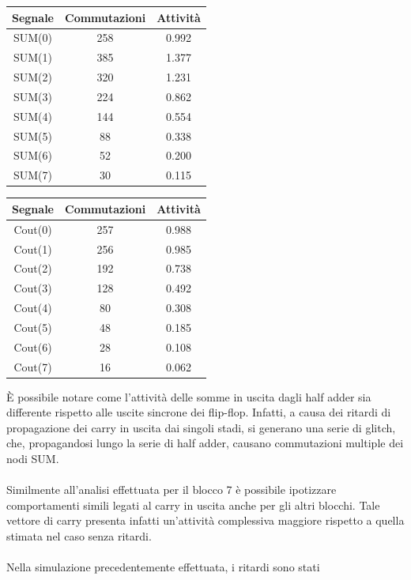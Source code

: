 \documentclass[11pt,  english, makeidx, a4paper, titlepage, oneside]{book}
\begin{document}
\begin{center}
	\begin{tabular}{|c|c|c|}
	\hline
	Segnale & Commutazioni & Attività \\ 
	\hline
	SUM(0) & 258  & 0.992  \\
	\hline
	SUM(1) & 385  & 1.377  \\
	\hline
	SUM(2) & 320  &  1.231  \\
	\hline
	SUM(3) & 224  & 0.862  \\
	\hline
	SUM(4) & 144  & 0.554  \\
	\hline
	SUM(5) & 88  & 0.338  \\
	\hline
	SUM(6) & 52  & 0.200  \\
	\hline
	SUM(7) & 30  & 0.115  \\
	\hline
	\end{tabular}	
	\begin{tabular}{|c|c|c|}
	\hline
	Segnale & Commutazioni & Attività \\ 
	\hline
	Cout(0) & 257  & 0.988  \\
	\hline
	Cout(1) & 256  & 0.985  \\
	\hline
	Cout(2) & 192  & 0.738  \\
	\hline
	Cout(3) & 128  & 0.492  \\
	\hline
	Cout(4) & 80  & 0.308  \\
	\hline
	Cout(5) & 48  & 0.185  \\
	\hline
	Cout(6) & 28  & 0.108  \\
	\hline
	Cout(7) & 16  & 0.062  \\
	\hline
	\end{tabular}
\end{center}
\vspace{0.3cm}
È possibile notare come l'attività delle somme in uscita dagli
half adder sia differente rispetto alle uscite sincrone dei flip-flop.
Infatti, a causa dei ritardi di propagazione dei carry in uscita dai 
singoli stadi, si generano una serie di glitch, che, propagandosi lungo
la serie di half adder, causano commutazioni multiple dei nodi SUM.
\\\\
Similmente all'analisi effettuata per il blocco 7 è possibile ipotizzare
comportamenti simili legati al carry in uscita anche per gli altri blocchi.
Tale vettore di carry presenta infatti un'attività complessiva maggiore 
rispetto a quella stimata nel caso senza ritardi.
\\\\
Nella simulazione precedentemente effettuata, i ritardi sono stati
\end{document}
